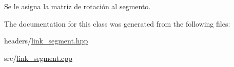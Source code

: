 Se le asigna la matriz de rotación al segmento. 



The documentation for this class was generated from the following files\-:\begin{DoxyCompactItemize}
\item 
headers/\hyperlink{link__segment_8hpp}{link\-\_\-segment.\-hpp}\item 
src/\hyperlink{link__segment_8cpp}{link\-\_\-segment.\-cpp}\end{DoxyCompactItemize}
